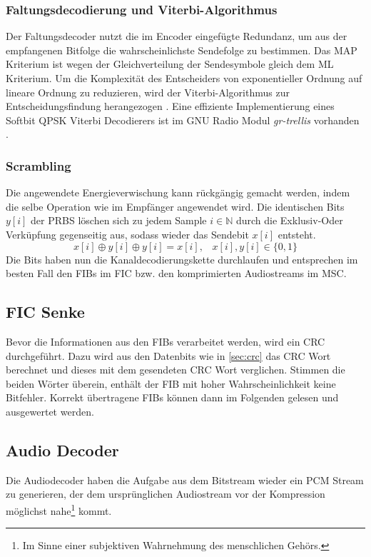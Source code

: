 \subsubsection{Faltungsdecodierung und Viterbi-Algorithmus}
Der Faltungsdecoder nutzt die im Encoder eingefügte Redundanz, um aus der empfangenen Bitfolge die wahrscheinlichste Sendefolge zu bestimmen. Das \ac{MAP} Kriterium ist wegen der Gleichverteilung der Sendesymbole gleich dem \ac{ML} Kriterium. Um die Komplexität des Entscheiders von exponentieller Ordnung auf lineare Ordnung zu reduzieren, wird der Viterbi-Algorithmus zur Entscheidungsfindung herangezogen \cite{nt1}. Eine effiziente Implementierung eines Softbit QPSK Viterbi Decodierers ist im GNU Radio Modul \textit{gr-trellis} vorhanden \cite{repo:gr-trellis}.

\subsubsection{Scrambling}
Die angewendete Energieverwischung kann rückgängig gemacht werden, indem die selbe Operation wie im Empfänger angewendet wird. Die identischen Bits $y[i]$ der \ac{PRBS} löschen sich zu jedem Sample $i \in \mathbb{N}$ durch die Exklusiv-Oder Verküpfung gegenseitig aus, sodass wieder das Sendebit $x[i]$ entsteht.
\begin{equation}
    x[i] \oplus y[i] \oplus y[i] = x[i], \; \; \; x[i],y[i] \in \{0,1\}
\end{equation}
Die Bits haben nun die Kanaldecodierungskette durchlaufen und entsprechen im besten Fall den FIBs im FIC bzw. den komprimierten Audiostreams im MSC.

\subsection{FIC Senke}
Bevor die Informationen aus den FIBs verarbeitet werden, wird ein \ac{CRC} durchgeführt. Dazu wird aus den Datenbits wie in \ref{sec:crc} das CRC Wort berechnet und dieses mit dem gesendeten CRC Wort verglichen. Stimmen die beiden Wörter überein, enthält der FIB mit hoher Wahrscheinlichkeit keine Bitfehler. Korrekt übertragene FIBs können dann im Folgenden gelesen und ausgewertet werden.

\subsection{Audio Decoder}
Die Audiodecoder haben die Aufgabe aus dem Bitstream wieder ein PCM Stream zu generieren, der dem ursprünglichen Audiostream vor der Kompression möglichst nahe\footnote{Im Sinne einer subjektiven Wahrnehmung des menschlichen Gehörs.} kommt.
